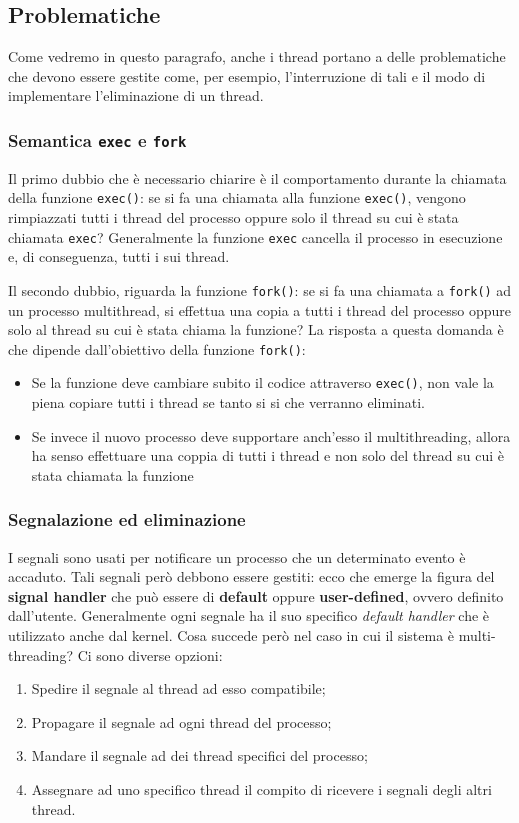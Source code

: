 \subsection{Problematiche}
Come vedremo in questo paragrafo, anche i thread portano a delle problematiche che devono essere gestite come, per esempio, l'interruzione di tali e il modo di implementare l'eliminazione di un thread.

\subsubsection{Semantica \texttt{exec} e \texttt{fork}}
Il primo dubbio che è necessario chiarire è il comportamento durante la chiamata della funzione \texttt{exec()}: se si fa una chiamata alla funzione \texttt{exec()}, vengono rimpiazzati tutti i thread del processo oppure solo il thread su cui è stata chiamata \texttt{exec}? Generalmente la funzione \texttt{exec} cancella il processo in esecuzione e, di conseguenza, tutti i sui thread.

Il secondo dubbio, riguarda la funzione \texttt{fork()}: se si fa una chiamata a \texttt{fork()} ad un processo multithread, si effettua una copia a tutti i thread del processo oppure solo al thread su cui è stata chiama la funzione? La risposta a questa domanda è che dipende dall'obiettivo della funzione \texttt{fork()}:
\vspace{-5px}
\begin{itemize}
\setlength{\itemsep}{-.15 em}
    \item Se la funzione deve cambiare subito il codice attraverso \texttt{exec()}, non vale la piena copiare tutti i thread se tanto si si che verranno eliminati.
    \item Se invece il nuovo processo deve supportare anch'esso il multithreading, allora ha senso effettuare una coppia di tutti i thread e non solo del thread su cui è stata chiamata la funzione
\end{itemize}
% 
\subsubsection{Segnalazione ed eliminazione}
I segnali sono usati per notificare un processo che un determinato evento è accaduto. Tali segnali però debbono essere gestiti: ecco che emerge la figura del \textbf{signal handler} che può essere di \textbf{default} oppure \textbf{user-defined}, ovvero definito dall'utente. Generalmente ogni segnale ha il suo specifico \textit{default handler} che è utilizzato anche dal kernel. Cosa succede però nel caso in cui il sistema è multi-threading? Ci sono diverse opzioni:
\vspace{-5px}
\begin{enumerate}
\setlength{\itemsep}{-.15 em}
    \item Spedire il segnale al thread ad esso compatibile;
    \item Propagare il segnale ad ogni thread del processo;
    \item Mandare il segnale ad dei thread specifici del processo;
    \item Assegnare ad uno specifico thread il compito di ricevere i segnali degli altri thread.
\end{enumerate}

